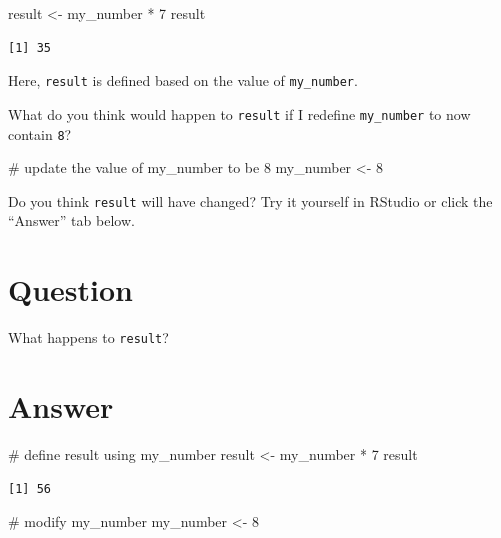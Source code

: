 \documentclass[
  letterpaper,
  DIV=11,
  numbers=noendperiod]{scrreprt}
\newenvironment{Shaded}{\begin{snugshade}}{\end{snugshade}}
\newcommand{\CommentTok}[1]{\textcolor[rgb]{0.37,0.37,0.37}{#1}}
\newcommand{\DecValTok}[1]{\textcolor[rgb]{0.68,0.00,0.00}{#1}}
\newcommand{\NormalTok}[1]{\textcolor[rgb]{0.00,0.23,0.31}{#1}}
\newcommand{\OtherTok}[1]{\textcolor[rgb]{0.00,0.23,0.31}{#1}}
\newcommand{\SpecialCharTok}[1]{\textcolor[rgb]{0.37,0.37,0.37}{#1}}
\begin{document}
\begin{Shaded}
\begin{Highlighting}[]
\NormalTok{result }\OtherTok{\textless{}{-}}\NormalTok{ my\_number }\SpecialCharTok{*} \DecValTok{7}
\NormalTok{result}
\end{Highlighting}
\end{Shaded}

\begin{verbatim}
[1] 35
\end{verbatim}

Here, \texttt{result} is defined based on the value of
\texttt{my\_number}.

What do you think would happen to \texttt{result} if I redefine
\texttt{my\_number} to now contain \texttt{8}?

\begin{Shaded}
\begin{Highlighting}[]
\CommentTok{\# update the value of my\_number to be 8}
\NormalTok{my\_number }\OtherTok{\textless{}{-}} \DecValTok{8}
\end{Highlighting}
\end{Shaded}

Do you think \texttt{result} will have changed? Try it yourself in
RStudio or click the ``Answer'' tab below.

\section{Question}

What happens to \texttt{result}?

\section{Answer}

\begin{Shaded}
\begin{Highlighting}[]
\CommentTok{\# define result using \textasciigrave{}my\_number\textasciigrave{}}
\NormalTok{result }\OtherTok{\textless{}{-}}\NormalTok{ my\_number }\SpecialCharTok{*} \DecValTok{7}
\NormalTok{result}
\end{Highlighting}
\end{Shaded}

\begin{verbatim}
[1] 56
\end{verbatim}

\begin{Shaded}
\begin{Highlighting}[]
\CommentTok{\# modify my\_number}
\NormalTok{my\_number }\OtherTok{\textless{}{-}} \DecValTok{8}
\end{Highlighting}
\end{Shaded}
\end{document}

